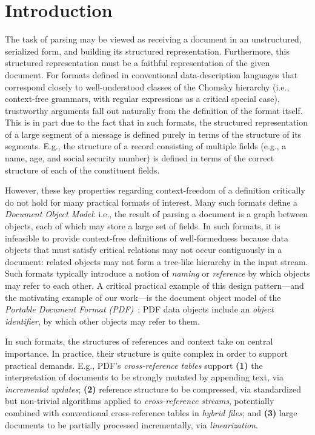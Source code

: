 \section{Introduction }
\label{sec:intro}
The task of parsing may be viewed as receiving a document in an
unstructured, serialized form, and building its structured
representation. Furthermore, this structured representation must be a
faithful representation of the given document.
%
For formats defined in conventional data-description languages that
correspond closely to well-understood classes of the Chomsky hierarchy
(i.e., context-free grammars, with regular expressions as a critical
special case), trustworthy arguments fall out naturally from the
definition of the format itself.
%
This is in part due to the fact that in such formats, the structured
representation of a large segment of a message is defined purely in
terms of the structure of its segments.
%
E.g., the structure of a record consisting of multiple fields (e.g., a
name, age, and social security number) is defined in terms of the
correct structure of each of the constituent fields.

However, these key properties regarding context-freedom of a
definition critically do not hold for many practical formats of
interest.
%
Many such formats define a \emph{Document Object Model}: i.e., the
result of parsing a document is a graph between objects, each
of which may store a large set of fields.
%
In such formats, it is infeasible to provide context-free definitions
of well-formedness because data objects that must satisfy critical
relations may not occur contiguously in a document: related objects
may not form a tree-like hierarchy in the input stream.
%
Such formats typically introduce a notion of \emph{naming} or
\emph{reference} by which objects may refer to each other.
%
A critical practical example of this design pattern---and the
motivating example of our work---is the document object model of the
\emph{Portable Document Format (PDF)}~\cite{isotc171sc2wg8ISO32000220202020};
%
PDF data objects include an \emph{object identifier}, by which other
objects may refer to them.

In such formats, the structures of references and context take on
central importance.
%
In practice, their structure is quite complex in order to support
practical demands.
%
E.g., PDF's \emph{cross-reference tables} support
% 
\textbf{(1)} the interpretation of documents to be strongly mutated by
appending text, via \emph{incremental updates};
%
\textbf{(2)} reference structure to be compressed, via standardized
but non-trivial algorithms applied to \emph{cross-reference streams},
potentially combined with conventional cross-reference tables in
\emph{hybrid files}; and
% 
\textbf{(3)} large documents to be partially processed incrementally,
via \emph{linearization}.

